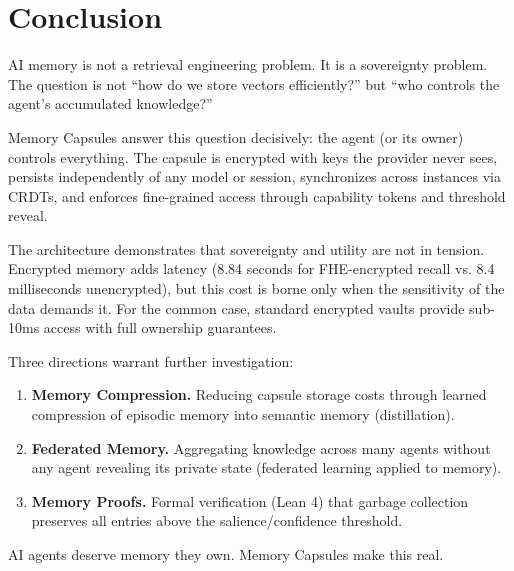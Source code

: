 \section{Conclusion}

\label{sec:conclusion}

AI memory is not a retrieval engineering problem. It is a sovereignty problem. The question is not ``how do we store vectors efficiently?'' but ``who controls the agent's accumulated knowledge?''

Memory Capsules answer this question decisively: the agent (or its owner) controls everything. The capsule is encrypted with keys the provider never sees, persists independently of any model or session, synchronizes across instances via CRDTs, and enforces fine-grained access through capability tokens and threshold reveal.

The architecture demonstrates that sovereignty and utility are not in tension. Encrypted memory adds latency (8.84 seconds for FHE-encrypted recall vs. 8.4 milliseconds unencrypted), but this cost is borne only when the sensitivity of the data demands it. For the common case, standard encrypted vaults provide sub-10ms access with full ownership guarantees.

Three directions warrant further investigation:

\begin{enumerate}
    \item \textbf{Memory Compression.} Reducing capsule storage costs through learned compression of episodic memory into semantic memory (distillation).
    \item \textbf{Federated Memory.} Aggregating knowledge across many agents without any agent revealing its private state (federated learning applied to memory).
    \item \textbf{Memory Proofs.} Formal verification (Lean 4) that garbage collection preserves all entries above the salience/confidence threshold.
\end{enumerate}

AI agents deserve memory they own. Memory Capsules make this real.

